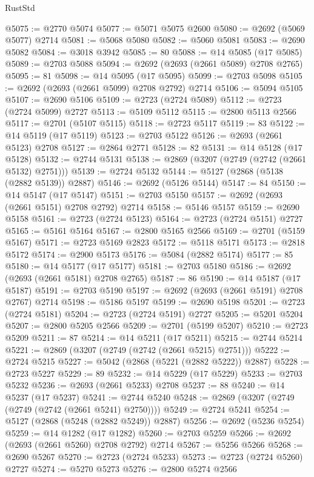 \begin{lexlean}{RustStd}
\begin{coremodule}
@5075 := @2770 @5074
@5077 := @5071 @5075 @2600
@5080 := @2692 (@5069 @5077) @2714
@5081 := @5068 @5080
@5082 := @5060 @5081
@5083 := @2690 @5082
@5084 := @3018 @3942
@5085 := 80
@5088 := @14 @5085 (@17 @5085)
@5089 := @2703 @5088
@5094 := @2692 (@2693 (@2661 @5089) @2708 @2765)
@5095 := 81
@5098 := @14 @5095 (@17 @5095)
@5099 := @2703 @5098
@5105 := @2692 (@2693 (@2661 @5099) @2708 @2792) @2714
@5106 := @5094 @5105
@5107 := @2690 @5106
@5109 := @2723 (@2724 @5089)
@5112 := @2723 (@2724 @5099) @2727
@5113 := @5109 @5112
@5115 := @2800 @5113 @2566
@5117 := @2701 (@5107 @5115)
@5118 := @2723 @5117
@5119 := 83
@5122 := @14 @5119 (@17 @5119)
@5123 := @2703 @5122
@5126 := @2693 (@2661 @5123) @2708
@5127 := @2864 @2771
@5128 := 82
@5131 := @14 @5128 (@17 @5128)
@5132 := @2744 @5131
@5138 := @2869 (@3207 (@2749 (@2742 (@2661 @5132) @2751)))
@5139 := @2724 @5132
@5144 := @5127 (@2868 (@5138 (@2882 @5139)) @2887)
@5146 := @2692 (@5126 @5144)
@5147 := 84
@5150 := @14 @5147 (@17 @5147)
@5151 := @2703 @5150
@5157 := @2692 (@2693 (@2661 @5151) @2708 @2792) @2714
@5158 := @5146 @5157
@5159 := @2690 @5158
@5161 := @2723 (@2724 @5123)
@5164 := @2723 (@2724 @5151) @2727
@5165 := @5161 @5164
@5167 := @2800 @5165 @2566
@5169 := @2701 (@5159 @5167)
@5171 := @2723 @5169 @2823
@5172 := @5118 @5171
@5173 := @2818 @5172
@5174 := @2900 @5173
@5176 := @5084 (@2882 @5174)
@5177 := 85
@5180 := @14 @5177 (@17 @5177)
@5181 := @2703 @5180
@5186 := @2692 (@2693 (@2661 @5181) @2708 @2765)
@5187 := 86
@5190 := @14 @5187 (@17 @5187)
@5191 := @2703 @5190
@5197 := @2692 (@2693 (@2661 @5191) @2708 @2767) @2714
@5198 := @5186 @5197
@5199 := @2690 @5198
@5201 := @2723 (@2724 @5181)
@5204 := @2723 (@2724 @5191) @2727
@5205 := @5201 @5204
@5207 := @2800 @5205 @2566
@5209 := @2701 (@5199 @5207)
@5210 := @2723 @5209
@5211 := 87
@5214 := @14 @5211 (@17 @5211)
@5215 := @2744 @5214
@5221 := @2869 (@3207 (@2749 (@2742 (@2661 @5215) @2751)))
@5222 := @2724 @5215
@5227 := @5042 (@2868 (@5221 (@2882 @5222)) @2887)
@5228 := @2723 @5227
@5229 := 89
@5232 := @14 @5229 (@17 @5229)
@5233 := @2703 @5232
@5236 := @2693 (@2661 @5233) @2708
@5237 := 88
@5240 := @14 @5237 (@17 @5237)
@5241 := @2744 @5240
@5248 := @2869 (@3207 (@2749 (@2749 (@2742 (@2661 @5241) @2750))))
@5249 := @2724 @5241
@5254 := @5127 (@2868 (@5248 (@2882 @5249)) @2887)
@5256 := @2692 (@5236 @5254)
@5259 := @14 @1282 (@17 @1282)
@5260 := @2703 @5259
@5266 := @2692 (@2693 (@2661 @5260) @2708 @2792) @2714
@5267 := @5256 @5266
@5268 := @2690 @5267
@5270 := @2723 (@2724 @5233)
@5273 := @2723 (@2724 @5260) @2727
@5274 := @5270 @5273
@5276 := @2800 @5274 @2566

\end{coremodule}
\end{lexlean}
